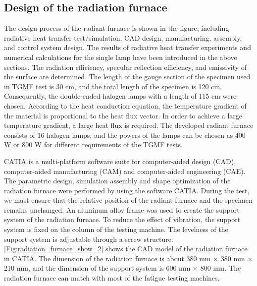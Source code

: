 \subsection{Design of the radiation furnace}
\noindent
The design process of the radiant furnace is shown in the figure, including radiative heat transfer test/simulation, CAD design, manufacturing, assembly, and control system design.
The results of radiative heat transfer experiments and numerical calculations for the single lamp have been introduced in the above sections.
The radiation efficiency, specular reflection efficiency, and emissivity of the surface are determined.
The length of the gauge section of the specimen used in TGMF test is 30 cm, and the total length of the specimen is 120 cm. Consequently, the double-ended halogen lamps with a length of 115 cm were chosen. According to the heat conduction equation, the temperature gradient of the material is proportional to the heat flux vector. In order to achieve a large temperature gradient, a large heat flux is required. The developed radiant furnace consists of 16 halogen lamps, and the powers of the lamps can be chosen as 400 W or 800 W for different requirements of the TGMF tests.

CATIA is a multi-platform software suite for computer-aided design (CAD), computer-aided manufacturing (CAM) and computer-aided engineering (CAE).
The parametric design, simulation assembly and shape optimization of the radiation furnace were performed by using the software CATIA.
During the test, we must ensure that the relative position of the radiant furnace and the specimen remains unchanged. An aluminum alloy frame was used to create the support system of the radiation furnace. To reduce the effect of vibration, the support system is fixed on the column of the testing machine. The levelness of the support system is adjustable through a screw structure. \ref{Fig:radiation_furnace_show_2} shows the CAD model of the radiation furnace in CATIA. The dimension of the radiation furnace is about 380 mm $\times$ 380 mm $\times$ 210 mm, and the dimension of the support system is 600 mm $\times$ 800 mm. The radiation furnace can match with most of the fatigue testing machines.

